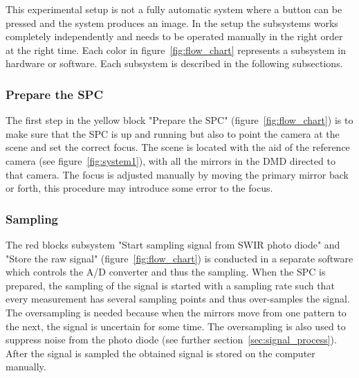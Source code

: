 This experimental setup is not a fully automatic system where a button can be pressed and the system produces an image. In the setup the subsystems works completely independently and needs to be operated manually in the right order at the right time. Each color in figure~\ref{fig:flow_chart} represents a subsystem in hardware or software. Each subsystem is described in the following subsections.

 
\subsubsection{Prepare the SPC}
\label{sec:p_spc}
The first step in the yellow block "Prepare the SPC" (figure~\ref{fig:flow_chart}) is to make sure that the SPC is up and running but also to point the camera at the scene and set the correct focus. The scene is located with the aid of the reference camera (see figure~\ref{fig:system1}), with all the mirrors in the DMD directed to that camera. The focus is adjusted manually by moving the primary mirror back or forth, this procedure may introduce some error to the focus.\\[0.1in]

\subsubsection{Sampling}
The red blocks subsystem "Start sampling signal from SWIR photo diode" and "Store the raw signal" (figure~\ref{fig:flow_chart}) is conducted in a separate software which controls the A/D converter and thus the sampling. When the SPC is prepared, the sampling of the signal is started with a sampling rate such that every measurement has several sampling points and thus over-samples the signal. The oversampling is needed because when the mirrors move from one pattern to the next, the signal is uncertain for some time. The oversampling is also used to suppress noise from the photo diode (see further section~\ref{sec:signal_process}). After the signal is sampled the obtained signal is stored on the computer manually.

